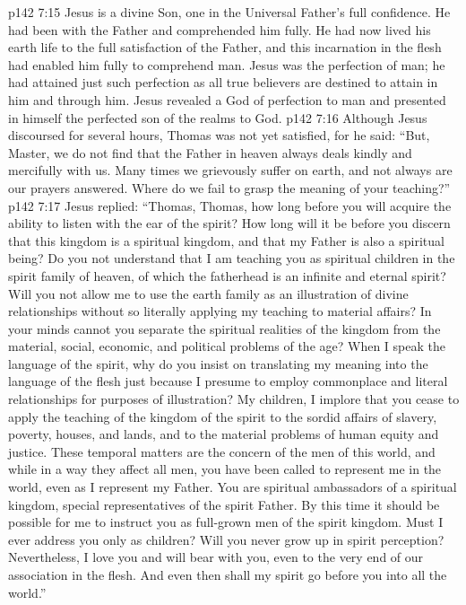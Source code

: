\vs p142 7:15 Jesus is a divine Son, one in the Universal Father’s full confidence. He had been with the Father and comprehended him fully. He had now lived his earth life to the full satisfaction of the Father, and this incarnation in the flesh had enabled him fully to comprehend man. Jesus was the perfection of man; he had attained just such perfection as all true believers are destined to attain in him and through him. Jesus revealed a God of perfection to man and presented in himself the perfected son of the realms to God.
\vs p142 7:16 Although Jesus discoursed for several hours, Thomas was not yet satisfied, for he said: “But, Master, we do not find that the Father in heaven always deals kindly and mercifully with us. Many times we grievously suffer on earth, and not always are our prayers answered. Where do we fail to grasp the meaning of your teaching?”
\vs p142 7:17 Jesus replied: \textcolor{ubdarkred}{“Thomas, Thomas, how long before you will acquire the ability to listen with the ear of the spirit? How long will it be before you discern that this kingdom is a spiritual kingdom, and that my Father is also a spiritual being? Do you not understand that I am teaching you as spiritual children in the spirit family of heaven, of which the fatherhead is an infinite and eternal spirit? Will you not allow me to use the earth family as an illustration of divine relationships without so literally applying my teaching to material affairs? In your minds cannot you separate the spiritual realities of the kingdom from the material, social, economic, and political problems of the age? When I speak the language of the spirit, why do you insist on translating my meaning into the language of the flesh just because I presume to employ commonplace and literal relationships for purposes of illustration? My children, I implore that you cease to apply the teaching of the kingdom of the spirit to the sordid affairs of slavery, poverty, houses, and lands, and to the material problems of human equity and justice. These temporal matters are the concern of the men of this world, and while in a way they affect all men, you have been called to represent me in the world, even as I represent my Father. You are spiritual ambassadors of a spiritual kingdom, special representatives of the spirit Father. By this time it should be possible for me to instruct you as full\hyp{}grown men of the spirit kingdom. Must I ever address you only as children? Will you never grow up in spirit perception? Nevertheless, I love you and will bear with you, even to the very end of our association in the flesh. And even then shall my spirit go before you into all the world.”}\plusone
